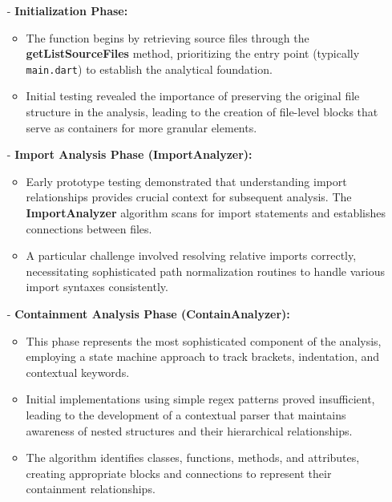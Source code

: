 \begin{itemize}
    \item[-] \textbf{Initialization Phase:}
    \begin{itemize}
        \item The function begins by retrieving source files through the \textbf{getListSourceFiles} method, prioritizing the entry point (typically \texttt{main.dart}) to establish the analytical foundation.
        \item Initial testing revealed the importance of preserving the original file structure in the analysis, leading to the creation of file-level blocks that serve as containers for more granular elements.
    \end{itemize}

    \item[-] \textbf{Import Analysis Phase (ImportAnalyzer):}
    \begin{itemize}
        \item Early prototype testing demonstrated that understanding import relationships provides crucial context for subsequent analysis. The \textbf{ImportAnalyzer} algorithm scans for import statements and establishes connections between files.
        \item A particular challenge involved resolving relative imports correctly, necessitating sophisticated path normalization routines to handle various import syntaxes consistently.
    \end{itemize}

    \item[-] \textbf{Containment Analysis Phase (ContainAnalyzer):}
    \begin{itemize}
        \item This phase represents the most sophisticated component of the analysis, employing a state machine approach to track brackets, indentation, and contextual keywords.
        \item Initial implementations using simple regex patterns proved insufficient, leading to the development of a contextual parser that maintains awareness of nested structures and their hierarchical relationships.
        \item The algorithm identifies classes, functions, methods, and attributes, creating appropriate blocks and connections to represent their containment relationships.
    \end{itemize}


\end{itemize}
